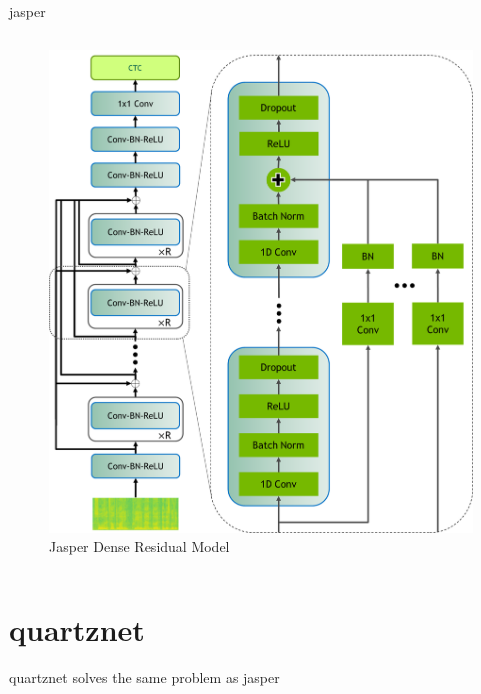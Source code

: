 \documentclass[aspectratio=169,xcolor={dvipsnames,svgnames}]{beamer}
\begin{document}
\begin{frame}[label={sec:jasper-prior-art}]{jasper}
\begin{columns}
\begin{column}{0.45\columnwidth}
\begin{figure}[htbp]
\includegraphics[width=.9\linewidth]{org-download-images/Contribution/2024-08-28_07-46-36_screenshot.png}
\caption{Jasper Dense Residual Model}
\end{figure}
\end{column}
\end{columns}
\end{frame}
\section{quartznet}
\label{sec:org4ac26e5}
\begin{frame}[label={sec:org90d4208}]{quartznet}
solves the same problem as jasper
\end{frame}
\end{document}
